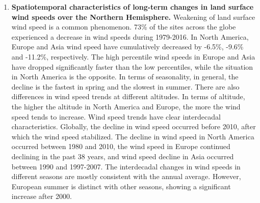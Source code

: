 \begin{enumerate}

\item  \textbf{Spatiotemporal characteristics of long-term changes in land surface wind speeds over the Northern Hemisphere.} Weakening of land surface wind speed is a common phenomenon. 73\% of the sites across the globe experienced a decrease in wind speeds during 1979-2016. In North America, Europe and Asia wind speed have cumulatively decreased by -6.5\%, -9.6\% and -11.2\%, respectively. The high percentile wind speeds in Europe and Asia have dropped significantly faster than the low percentiles, while the situation in North America is the opposite. In terms of seasonality, in general, the decline is the fastest in spring and the slowest in summer. There are also differences in wind speed trends at different altitudes. In terms of altitude, the higher the altitude in North America and Europe, the more the wind speed tends to increase. Wind speed trends have clear interdecadal characteristics. Globally, the decline in wind speed occurred before 2010, after which the wind speed stabilized. The decline in wind speed in North America occurred between 1980 and 2010, the wind speed in Europe continued declining in the past 38 years, and wind speed decline in Asia occurred between 1990 and 1997-2007. The interdecadal changes in wind speeds in different seasons are mostly consistent with the annual average. However, European summer is distinct with other seasons, showing a significant increase after 2000.


\end{enumerate}
